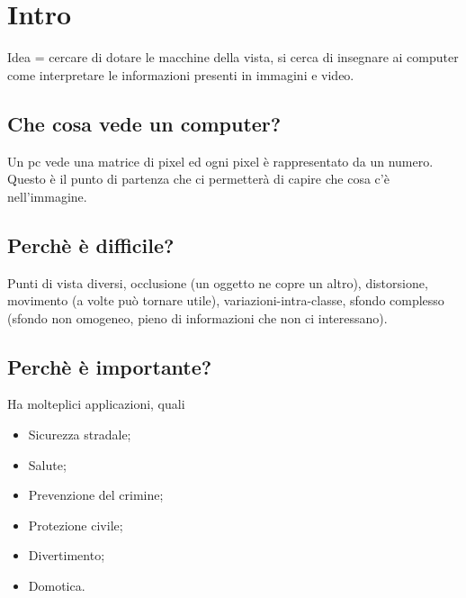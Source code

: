 \chapter{Intro}

Idea = cercare di dotare le macchine della vista, si cerca di insegnare ai computer come interpretare le informazioni presenti in immagini e video. 
\section{Che cosa vede un computer?}
Un pc vede una matrice di pixel ed ogni pixel è rappresentato da un numero. Questo è il punto di partenza che ci permetterà di capire che cosa c'è nell'immagine.
\section{Perchè è difficile?}
Punti di vista diversi, occlusione (un oggetto ne copre un altro), distorsione, movimento (a volte può tornare utile), variazioni-intra-classe, sfondo complesso (sfondo non omogeneo, pieno di informazioni che non ci interessano).
\section{Perchè è importante?}
Ha molteplici applicazioni, quali
\begin{itemize}
	\item Sicurezza stradale;
	\item Salute;
	\item Prevenzione del crimine;
	\item Protezione civile;
	\item Divertimento;
	\item Domotica.
\end{itemize}

\newpage

